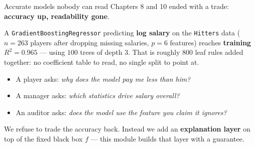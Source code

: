 \documentclass[aspectratio=169,11pt]{beamer}
\begin{document}
\begin{frame}{Accurate models nobody can read}
  \footnotesize
  Chapters 8 and 10 ended with a trade: \textbf{accuracy up, readability gone}.
  \begin{numexample}
    A \texttt{GradientBoostingRegressor} predicting \textbf{log salary} on the
    \texttt{Hitters} data ($n=263$ players after dropping missing salaries,
    $p=6$ features) reaches \textbf{training $R^2 = 0.965$} --- using
    $100$ trees of depth $3$. That is roughly $800$ leaf rules added together:
    no coefficient table to read, no single split to point at.
  \end{numexample}
  \begin{readme}
    \begin{itemize}
      \item A player asks: \emph{why does the model pay me less than him?}
      \item A manager asks: \emph{which statistics drive salary overall?}
      \item An auditor asks: \emph{does the model use the feature you claim it ignores?}
    \end{itemize}
  \end{readme}
  \begin{takeaway}
    We refuse to trade the accuracy back. Instead we add an \textbf{explanation layer}
    on top of the fixed black box $f$ --- this module builds that layer with a guarantee.
  \end{takeaway}
\end{frame}
\end{document}
